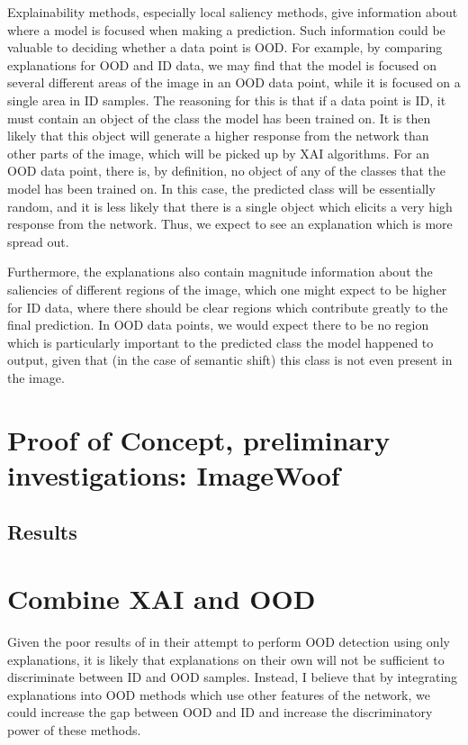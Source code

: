 \documentclass[UKenglish]{uiomasterthesis} %
\theoremstyle{definition}
\begin{document}
Explainability methods, especially local saliency methods, give information about where a model is focused when making a prediction. Such information could be valuable to deciding whether a data point is OOD. For example, by comparing explanations for OOD and ID data, we may find that the model is focused on several different areas of the image in an OOD data point, while it is focused on a single area in ID samples. The reasoning for this is that if a data point is ID, it must contain an object of the class the model has been trained on. It is then likely that this object will generate a higher response from the network than other parts of the image, which will be picked up by XAI algorithms. For an OOD data point, there is, by definition, no object of any of the classes that the model has been trained on. In this case, the predicted class will be essentially random, and it is less likely that there is a single object which elicits a very high response from the network. Thus, we expect to see an explanation which is more spread out.

Furthermore, the explanations also contain magnitude information about the saliencies of different regions of the image, which one might expect to be higher for ID data, where there should be clear regions which contribute greatly to the final prediction. In OOD data points, we would expect there to be no region which is particularly important to the predicted class the model happened to output, given that (in the case of semantic shift) this class is not even present in the image.

\section{Proof of Concept, preliminary investigations: ImageWoof}


\subsection{Results}



\section{Combine XAI and OOD}

Given the poor results of \cite{martinez} in their attempt to perform OOD detection using only explanations, it is likely that explanations on their own will not be sufficient to discriminate between ID and OOD samples. Instead, I believe that by integrating explanations into OOD methods which use other features of the network, we could increase the gap between OOD and ID and increase the discriminatory power of these methods.
\end{document}
